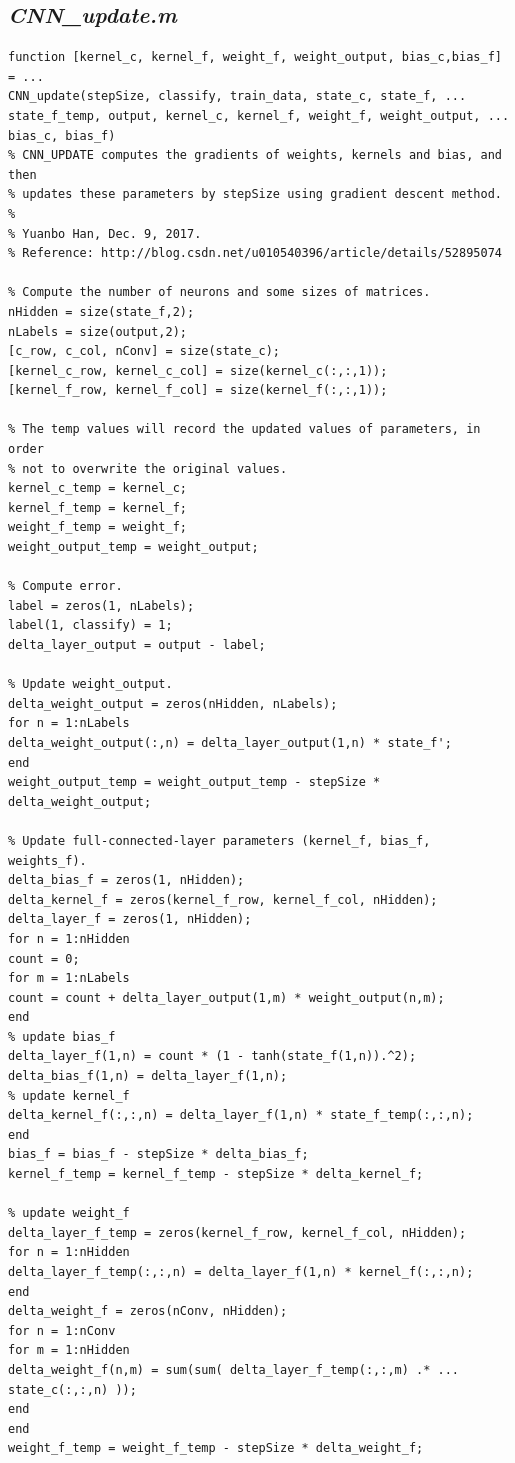 \documentclass{article}
\begin{document}
\subsection{\emph{CNN\_update.m}}
\begin{lstlisting}
function [kernel_c, kernel_f, weight_f, weight_output, bias_c,bias_f] = ...
CNN_update(stepSize, classify, train_data, state_c, state_f, ...
state_f_temp, output, kernel_c, kernel_f, weight_f, weight_output, ...
bias_c, bias_f)
% CNN_UPDATE computes the gradients of weights, kernels and bias, and then
% updates these parameters by stepSize using gradient descent method.
%
% Yuanbo Han, Dec. 9, 2017.
% Reference: http://blog.csdn.net/u010540396/article/details/52895074

% Compute the number of neurons and some sizes of matrices.
nHidden = size(state_f,2);
nLabels = size(output,2);
[c_row, c_col, nConv] = size(state_c);
[kernel_c_row, kernel_c_col] = size(kernel_c(:,:,1));
[kernel_f_row, kernel_f_col] = size(kernel_f(:,:,1));

% The temp values will record the updated values of parameters, in order
% not to overwrite the original values.
kernel_c_temp = kernel_c;
kernel_f_temp = kernel_f;
weight_f_temp = weight_f;
weight_output_temp = weight_output;

% Compute error.
label = zeros(1, nLabels);
label(1, classify) = 1;
delta_layer_output = output - label;

% Update weight_output.
delta_weight_output = zeros(nHidden, nLabels);
for n = 1:nLabels
delta_weight_output(:,n) = delta_layer_output(1,n) * state_f';
end
weight_output_temp = weight_output_temp - stepSize * delta_weight_output;

% Update full-connected-layer parameters (kernel_f, bias_f, weights_f).
delta_bias_f = zeros(1, nHidden);
delta_kernel_f = zeros(kernel_f_row, kernel_f_col, nHidden);
delta_layer_f = zeros(1, nHidden);
for n = 1:nHidden
count = 0;
for m = 1:nLabels
count = count + delta_layer_output(1,m) * weight_output(n,m);
end
% update bias_f
delta_layer_f(1,n) = count * (1 - tanh(state_f(1,n)).^2);
delta_bias_f(1,n) = delta_layer_f(1,n);
% update kernel_f
delta_kernel_f(:,:,n) = delta_layer_f(1,n) * state_f_temp(:,:,n);
end
bias_f = bias_f - stepSize * delta_bias_f;
kernel_f_temp = kernel_f_temp - stepSize * delta_kernel_f;

% update weight_f
delta_layer_f_temp = zeros(kernel_f_row, kernel_f_col, nHidden);
for n = 1:nHidden
delta_layer_f_temp(:,:,n) = delta_layer_f(1,n) * kernel_f(:,:,n);
end
delta_weight_f = zeros(nConv, nHidden);
for n = 1:nConv
for m = 1:nHidden
delta_weight_f(n,m) = sum(sum( delta_layer_f_temp(:,:,m) .* ...
state_c(:,:,n) ));
end
end
weight_f_temp = weight_f_temp - stepSize * delta_weight_f;


\end{lstlisting}
\end{document}
